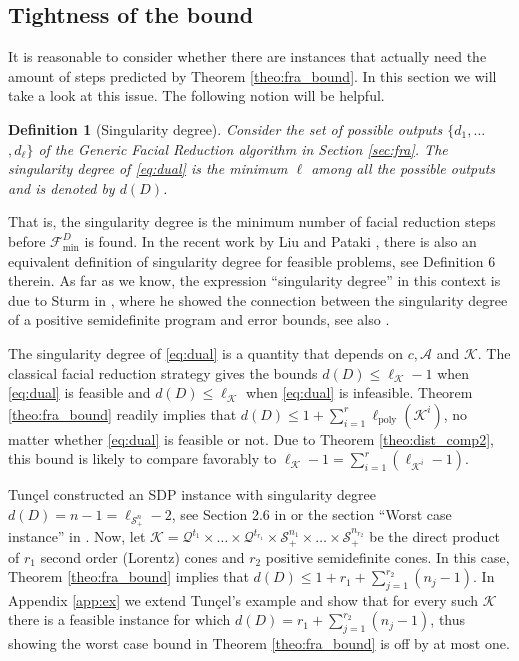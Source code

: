 \documentclass{article}
\newcommand{\SOC}[1]{{\mathcal{Q}^{#1}}}
\newcommand{\PSDcone}[1]{{\mathcal{S}^{#1}_+}}
\newcommand{\minFaceD}{ {\mathcal{F}_{\min}^D}}
\newcommand{\stdMap}{ {\mathcal{A}}}
\newcommand{\stdCone}{ {\mathcal{K}}}
\newcommand{\distP}{\ell _{\text{poly}}}
\newtheorem{definition}{Definition}
\begin{document}
\subsection{Tightness of the bound}\label{sec:tight}
It is 
reasonable to consider whether there are instances that actually need 
the amount of steps predicted by Theorem \ref{theo:fra_bound}. In this section we will 
take a look at this issue. The following notion will be helpful.

\begin{definition}[Singularity degree]\label{def:sing}
	Consider the set  of possible outputs  $\{d_1,\ldots$ $, d_\ell\}$ of 
	the Generic Facial Reduction algorithm in Section \ref{sec:fra}.
	The singularity degree of \eqref{eq:dual} is the minimum $\ell$ among 
	all the possible outputs and is denoted by $d(D)$.
\end{definition}

That is, the singularity degree is the minimum number of facial reduction steps before $\minFaceD$ is found. In the recent work by Liu and Pataki \cite{LP17}, there is also an equivalent definition of singularity degree for 
feasible problems, see Definition 6 therein.
As far as we know, the expression ``singularity degree'' in this context is due to 
Sturm  in \cite{sturm_error_2000}, where he showed the connection between the singularity 
degree of a positive semidefinite program and  error bounds, see also \cite{sturm_handbook}.


The singularity degree of \eqref{eq:dual} is a quantity that depends on 
$c, \stdMap$ and $\stdCone$. The classical facial reduction 
strategy gives the bounds $d(D) \leq \ell_\stdCone -1$ when \eqref{eq:dual} is 
feasible and $d(D) \leq \ell_\stdCone$ when \eqref{eq:dual} is infeasible.
Theorem \ref{theo:fra_bound} readily implies that 
$d(D) \leq 1+ \sum _{i=1}^{r} \distP(\stdCone ^i)$, no matter whether \eqref{eq:dual} is 
feasible or not. Due to Theorem \ref{theo:dist_comp2}, this bound is likely 
to compare favorably to  $\ell_\stdCone -1 =  \sum _{i=1}^{r} (\ell _{\stdCone^i} -1)$.


Tun\c{c}el constructed an SDP instance with singularity degree $d(D) = n-1 = \ell _{\PSDcone{n}}-2$, 
see Section 2.6 in \cite{tuncel_polyhedral_2010} or the section ``Worst case instance'' in \cite{csw13}. Now, 
let 
$\stdCone = \SOC{t_1} \times \ldots\times \SOC{t_{r_1}} \times \PSDcone{n_1}  \times \ldots \times \PSDcone{n_{r_2}}$ be
the direct product of $r_1$ second order (Lorentz) cones and $r_2$ positive semidefinite cones.
In this case, Theorem \ref{theo:fra_bound} implies that
$
d(D) \leq 1 + r_1 + \sum _{j = 1}^{r_2} (n_j  - 1).
$ In Appendix \ref{app:ex} we  extend Tun\c{c}el's example and show that for every such $\stdCone$ there is a feasible instance for which 
$ d(D) = r_1 + \sum _{j = 1}^{r_2} (n_j  - 1)$, thus showing the worst case bound in Theorem \ref{theo:fra_bound} is off by at most one. 
\end{document}
